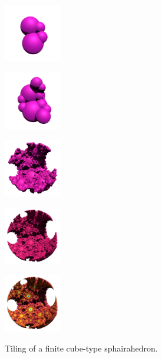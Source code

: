 \documentclass[dvipdfmx]{interact}
\theoremstyle{plain}%
\theoremstyle{definition}
\theoremstyle{remark}
\theoremstyle{problemstyle}
\begin{document}
\begin{figure}[H]
 \begin{minipage}[t]{0.18\textwidth}
  \centering
  \includegraphics[width=1in, height=1in, keepaspectratio]{./img/visualization/sphereStep1.png}
  \label{}
 \end{minipage}
 \hspace*{\fill}
 \begin{minipage}[t]{0.18\textwidth}
  \centering
  \includegraphics[width=1in, height=1in, keepaspectratio]{./img/visualization/sphereStep2.png}
  \label{}
 \end{minipage}
 \hspace*{\fill}
 \begin{minipage}[t]{0.18\textwidth}
  \centering
  \includegraphics[width=1in, height=1in, keepaspectratio]{./img/visualization/sphereStep5.png}
  \label{}
 \end{minipage}
 \hspace*{\fill}
 \begin{minipage}[t]{0.18\textwidth}
  \centering
  \includegraphics[width=1in, height=1in, keepaspectratio]{./img/visualization/sphereStep10.png}
  \label{}
 \end{minipage}
 \hspace*{\fill}
 \begin{minipage}[t]{0.18\textwidth}
  \centering
  \includegraphics[width=1in, height=1in, keepaspectratio]{./img/visualization/sphereFinal.png}
  \label{}
 \end{minipage}
 \hspace*{\fill}
 \caption{Tiling of a finite cube-type sphairahedron.}
 \label{}
\end{figure}
\end{document}

